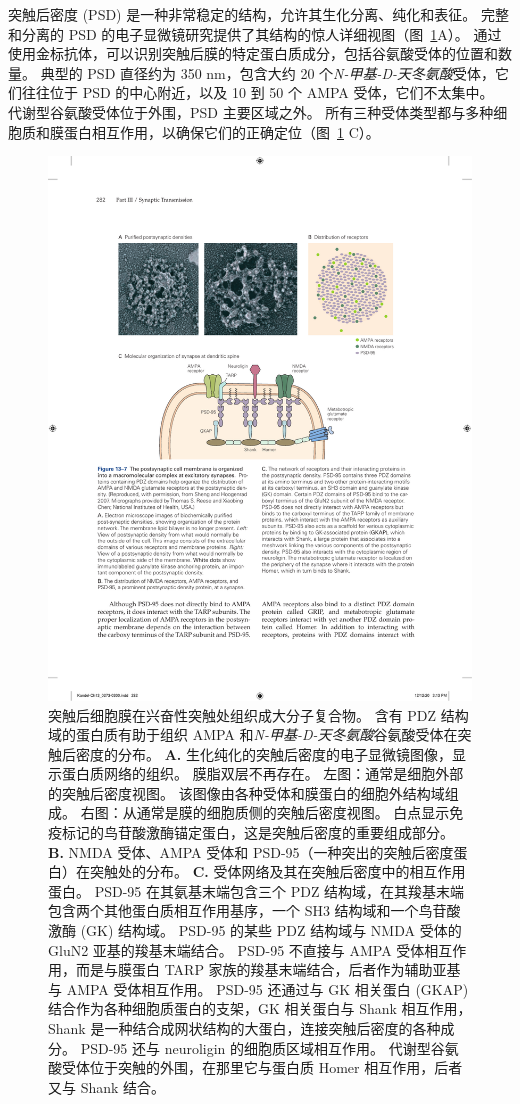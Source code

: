 突触后密度 (PSD) 是一种非常稳定的结构，允许其生化分离、纯化和表征。
完整和分离的 PSD 的电子显微镜研究提供了其结构的惊人详细视图（图~\ref{fig:13_7}A）。 
通过使用金标抗体，可以识别突触后膜的特定蛋白质成分，包括谷氨酸受体的位置和数量。
典型的 PSD 直径约为 350 nm，包含大约 20 个\textit{N-甲基-D-天冬氨酸}受体，它们往往位于 PSD 的中心附近，以及 10 到 50 个 AMPA 受体，它们不太集中。
代谢型谷氨酸受体位于外围，PSD 主要区域之外。
所有三种受体类型都与多种细胞质和膜蛋白相互作用，以确保它们的正确定位（图~\ref{fig:13_7} C）。


\begin{figure}[htbp]
	\centering
	\includegraphics[width=0.7\linewidth]{chap13/fig_13_7}
	\caption{突触后细胞膜在兴奋性突触处组织成大分子复合物。
		含有 PDZ 结构域的蛋白质有助于组织 AMPA 和\textit{N-甲基-D-天冬氨酸}谷氨酸受体在突触后密度的分布\cite{sheng2007postsynaptic}。
		\textbf{A.} 生化纯化的突触后密度的电子显微镜图像，显示蛋白质网络的组织。
		膜脂双层不再存在。
		左图：通常是细胞外部的突触后密度视图。
		该图像由各种受体和膜蛋白的细胞外结构域组成。
		右图：从通常是膜的细胞质侧的突触后密度视图。
		白点显示免疫标记的鸟苷酸激酶锚定蛋白，这是突触后密度的重要组成部分。
		\textbf{B.} NMDA 受体、AMPA 受体和 PSD-95（一种突出的突触后密度蛋白）在突触处的分布。
		\textbf{C.} 受体网络及其在突触后密度中的相互作用蛋白。
		PSD-95 在其氨基末端包含三个 PDZ 结构域，在其羧基末端包含两个其他蛋白质相互作用基序，一个 SH3 结构域和一个鸟苷酸激酶 (GK) 结构域。
		PSD-95 的某些 PDZ 结构域与 NMDA 受体的 GluN2 亚基的羧基末端结合。
		PSD-95 不直接与 AMPA 受体相互作用，而是与膜蛋白 TARP 家族的羧基末端结合，后者作为辅助亚基与 AMPA 受体相互作用。
		PSD-95 还通过与 GK 相关蛋白 (GKAP) 结合作为各种细胞质蛋白的支架，GK 相关蛋白与 Shank 相互作用，Shank 是一种结合成网状结构的大蛋白，连接突触后密度的各种成分。
		PSD-95 还与 neuroligin 的细胞质区域相互作用。
		代谢型谷氨酸受体位于突触的外围，在那里它与蛋白质 Homer 相互作用，后者又与 Shank 结合。}
	\label{fig:13_7}
\end{figure}



